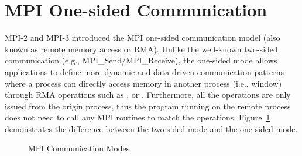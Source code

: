 \section{MPI One-sided Communication}\label{sec:back-rma}

MPI-2 and MPI-3 introduced the MPI one-sided communication model
(also known as remote memory access or RMA). Unlike the well-known
two-sided communication (e.g., MPI\_Send\slash MPI\_Receive), the one-sided
mode allows applications to define more dynamic and data-driven communication
patterns where a process can directly access memory in another process
(i.e., window) through RMA operations such as ,  or
. Furthermore, all the operations are only issued from the
origin process, thus the program running on the remote process does not
need to call any MPI routines to match the operations. Figure~\ref{fig:back-rma}
demonstrates the difference between the two-sided mode and the one-sided mode.

\begin{figure}%
\centering
{}
\hspace{-0.02\textwidth}
\caption{MPI Communication Modes}
\label{fig:back-rma}
\end{figure}



